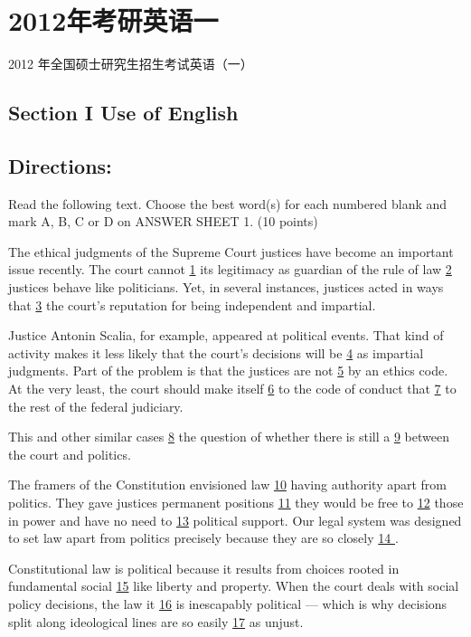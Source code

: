 \documentclass[UTF8,11pt]{ctexart}
\begin{document}
\section*{2012年考研英语一}
2012 年全国硕士研究生招生考试英语（一）


\subsection*{\textbf{Section I Use of English}}


\subsection*{\textbf{Directions:}}


Read the following text. Choose the best word(s) for each numbered blank and mark A, B, C or D on ANSWER SHEET 1. (10 points)


The ethical judgments of the Supreme Court justices have become an important issue recently. The court cannot \uline{1} its legitimacy as guardian of the rule of law \uline{2} justices behave like politicians. Yet, in several instances, justices acted in ways that \uline{3} the court’s reputation for being independent and impartial.


Justice Antonin Scalia, for example, appeared at political events. That kind of activity makes it less likely that the court’s decisions will be \uline{4} as impartial judgments. Part of the problem is that the justices are not \uline{5} by an ethics code. At the very least, the court should make itself \uline{6} to the code of conduct that \uline{7} to the rest of the federal judiciary.


This and other similar cases \uline{8} the question of whether there is still a \uline{9} between the court and politics.


The framers of the Constitution envisioned law \uline{10} having authority apart from politics. They gave justices permanent positions \uline{11} they would be free to \uline{12} those in power and have no need to \uline{13} political support. Our legal system was designed to set law apart from politics precisely because they are so closely \uline{14 }.


Constitutional law is political because it results from choices rooted in fundamental social \uline{15} like liberty and property. When the court deals with social policy decisions, the law it \uline{16} is inescapably political — which is why decisions split along ideological lines are so easily \uline{17} as unjust.
\end{document}

